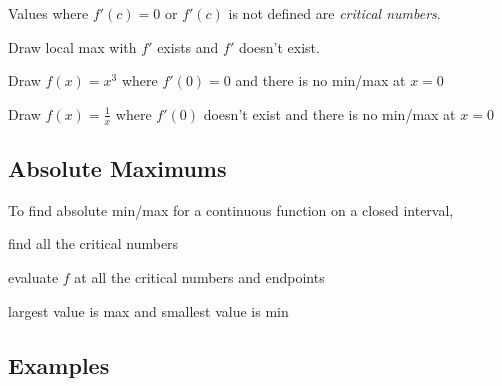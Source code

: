 \documentclass[letterpaper, landscape]{exam}
\begin{document}
  Values where $f'(c) = 0$ or $f'(c)$ is not defined are {\em critical numbers}.

  \begin{itemize*}
    \item Draw local max with $f'$ exists and $f'$ doesn't exist.
    \item Draw $f(x) = x^3$ where $f'(0) = 0$ and there is no min/max at $x = 0$
    \item Draw $f(x) = \frac{1}{x}$ where $f'(0)$ doesn't exist and there is no min/max at $x = 0$
  \end{itemize*}

  \subsection{Absolute Maximums} %
  
  To find absolute min/max for a continuous function on a closed interval, 

  \begin{itemize*}
    \item find all the critical numbers
    \item evaluate $f$ at all the critical numbers and endpoints
    \item largest value is max and smallest value is min
  \end{itemize*}

  \subsection{Examples} %
\end{document}
